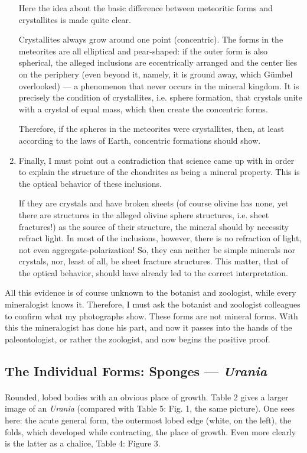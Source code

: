 \documentclass[a4paper, 12pt, oneside]{article}
\begin{document}
\begin{enumerate}
    Here the idea about the basic difference between meteoritic forms and crystallites is made quite clear.
    
    Crystallites always grow around one point (concentric). The forms in the meteorites are all elliptical and pear-shaped: if the outer form is also spherical, the alleged inclusions are eccentrically arranged and the center lies on the periphery (even beyond it, namely, it is ground away, which Gümbel overlooked) — a phenomenon that never occurs in the mineral kingdom. It is precisely the condition of crystallites, i.e. sphere formation, that crystals unite with a crystal of equal mass, which then create the concentric forms.
    
    Therefore, if the spheres in the meteorites were crystallites, then, at least according to the laws of Earth, concentric formations should show.
    \item Finally, I must point out a contradiction that science came up with in order to explain the structure of the chondrites as being a mineral property. This is the optical behavior of these inclusions.
    
    If they are crystals and have broken sheets (of course olivine has none, yet there are structures in the alleged olivine sphere structures, i.e. sheet fractures!) as the source of their structure, the mineral should by necessity refract light. In most of the inclusions, however, there is no refraction of light, not even aggregate-polarization! So, they can neither be simple minerals nor crystals, nor, least of all, be sheet fracture structures. This matter, that of the optical behavior, should have already led to the correct interpretation.
\end{enumerate}
All this evidence is of course unknown to the botanist and zoologist, while every mineralogist knows it. Therefore, I must ask the botanist and zoologist colleagues to confirm what my photographs show. These forms are not mineral forms. With this the mineralogist has done his part, and now it passes into the hands of the paleontologist, or rather the zoologist, and now begins the positive proof.
\clearpage
\subsection{The Individual Forms: Sponges — \emph{Urania}}
\paragraph{}
Rounded, lobed bodies with an obvious place of growth. Table 2 gives a larger image of an \emph{Urania} (compared with Table 5: Fig. 1, the same picture). One sees here: the acute general form, the outermost lobed edge (white, on the left), the folds, which developed while contracting, the place of growth. Even more clearly is the latter as a chalice, Table 4: Figure 3.
\end{document}
